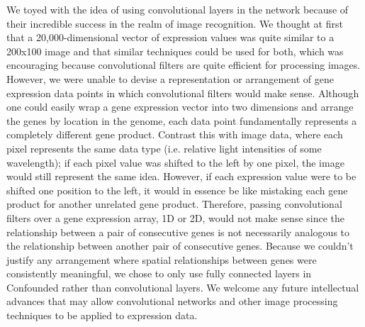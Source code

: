 \documentclass[notitlepage]{article}
\begin{document}
We toyed with the idea of using convolutional layers \cite{krizhevsky_imagenet_2012-1} in the network because of their incredible success in the realm of image recognition.
We thought at first that a 20,000-dimensional vector of expression values was quite similar to a 200x100 image and that similar techniques could be used for both, which was encouraging because convolutional filters are quite efficient for processing images.
However, we were unable to devise a representation or arrangement of gene expression data points in which convolutional filters would make sense.
Although one could easily wrap a gene expression vector into two dimensions and arrange the genes by location in the genome, each data point fundamentally represents a completely different gene product.
Contrast this with image data, where each pixel represents the same data type (i.e. relative light intensities of some wavelength); if each pixel value was shifted to the left by one pixel, the image would still represent the same idea.
However, if each expression value were to be shifted one position to the left, it would in essence be like mistaking each gene product for another unrelated gene product.
Therefore, passing convolutional filters over a gene expression array, 1D or 2D, would not make sense since the relationship between a pair of consecutive genes is not necessarily analogous to the relationship between another pair of consecutive genes.
Because we couldn't justify any arrangement where spatial relationships between genes were consistently meaningful, we chose to only use fully connected layers in Confounded rather than convolutional layers.
We welcome any future intellectual advances that may allow convolutional networks and other image processing techniques to be applied to expression data.
\end{document}
